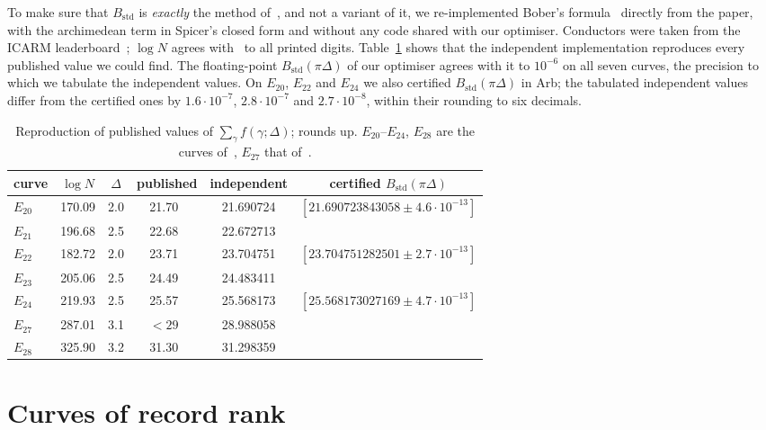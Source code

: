\documentclass[11pt]{amsart}
\theoremstyle{remark}
\theoremstyle{definition}
\begin{document}
To make sure that $B_{\mathrm{std}}$ is \emph{exactly} the method of~\cite{Bober,KSW}, and not a variant of it, we re-implemented Bober's formula~\cite[arXiv version, eq.~(3)]{Bober} directly from the paper, with the archimedean term in Spicer's closed form and without any code shared with our optimiser. Conductors were taken from the ICARM leaderboard~\cite{ICARM}; $\log N$ agrees with~\cite[Table~1]{Bober} to all printed digits. Table~\ref{tab:valid} shows that the independent implementation reproduces every published value we could find. The floating-point $B_{\mathrm{std}}(\pi\Delta)$ of our optimiser agrees with it to $10^{-6}$ on all seven curves, the precision to which we tabulate the independent values. On $E_{20}$, $E_{22}$ and $E_{24}$ we also certified $B_{\mathrm{std}}(\pi\Delta)$ in Arb; the tabulated independent values differ from the certified ones by $1.6\cdot10^{-7}$, $2.8\cdot10^{-7}$ and $2.7\cdot10^{-8}$, within their rounding to six decimals.

\begin{table}[h]
\centering\small
\begin{tabular}{lccccc}
\toprule
curve & $\log N$ & $\Delta$ & published & independent & certified $B_{\mathrm{std}}(\pi\Delta)$\\
\midrule
$E_{20}$ & 170.09 & 2.0 & 21.70~\cite{Bober} & 21.690724 & $[21.690723843058\pm4.6\cdot10^{-13}]$\\
$E_{21}$ & 196.68 & 2.5 & 22.68~\cite{Bober} & 22.672713 & \\
$E_{22}$ & 182.72 & 2.0 & 23.71~\cite{Bober} & 23.704751 & $[23.704751282501\pm2.7\cdot10^{-13}]$\\
$E_{23}$ & 205.06 & 2.5 & 24.49~\cite{Bober} & 24.483411 & \\
$E_{24}$ & 219.93 & 2.5 & 25.57~\cite{Bober} & 25.568173 & $[25.568173027169\pm4.7\cdot10^{-13}]$\\
$E_{27}$ & 287.01 & 3.1 & $<29$~\cite{KSW} & 28.988058 & \\
$E_{28}$ & 325.90 & 3.2 & 31.30~\cite{Bober} & 31.298359 & \\
\bottomrule
\end{tabular}
\caption{Reproduction of published values of $\sum_\gamma f(\gamma;\Delta)$; \cite{Bober} rounds up. $E_{20}$--$E_{24}$, $E_{28}$ are the curves of~\cite{Bober}, $E_{27}$ that of~\cite{KSW}.}
\label{tab:valid}
\end{table}

\section{Curves of record rank}\label{sec:records}
\end{document}
